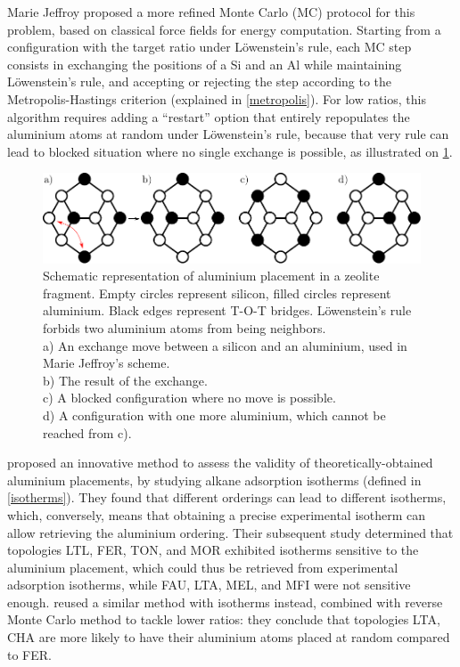 \documentclass[main.tex]{subfiles}
\begin{document}
Marie Jeffroy \cite{Jeffroy}\label{mariejeffroy_al} proposed a more refined Monte Carlo (MC) protocol for this problem, based on classical force fields for energy computation. Starting from a configuration with the target \SiAl ratio under L\"owenstein's rule, each MC step consists in exchanging the positions of a Si and an Al while maintaining L\"owenstein's rule, and accepting or rejecting the step according to the Metropolis-Hastings criterion (explained in \cref{metropolis}). For low \SiAl ratios, this algorithm requires adding a ``restart'' option that entirely repopulates the aluminium atoms at random under L\"owenstein's rule, because that very rule can lead to blocked situation where no single \SiAl exchange is possible, as illustrated on \cref{fig:blocked_situation}.

\begin{figure}
	\centering
	\includegraphics[width=\columnwidth]{figures/cations/blocked_situation.pdf}
	\caption{Schematic representation of aluminium placement in a zeolite fragment. Empty circles represent silicon, filled circles represent aluminium. Black edges represent T-O-T bridges. L\"owenstein's rule forbids two aluminium atoms from being neighbors.\\a) An exchange move between a silicon and an aluminium, used in Marie Jeffroy's scheme\autocite{Jeffroy}.\\b) The result of the exchange.\\c) A blocked configuration where no move is possible.\\d) A configuration with one more aluminium, which cannot be reached from c).}\label{fig:blocked_situation}
\end{figure}

\Textcite{AlDistributionAlcanes} proposed an innovative method to assess the validity of theoretically-obtained aluminium placements, by studying alkane adsorption isotherms (defined in \cref{isotherms}). They found that different \SiAl orderings can lead to different isotherms, which, conversely, means that obtaining a precise experimental isotherm can allow retrieving the aluminium ordering. Their subsequent study \cite{AlDistributionAlcanes2} determined that topologies LTL, FER, TON, and MOR exhibited isotherms sensitive to the aluminium placement, which could thus be retrieved from experimental adsorption isotherms, while FAU, LTA, MEL, and MFI were not sensitive enough. \Textcite{AlDistributionCO2Adsorption} reused a similar method with  isotherms instead, combined with reverse Monte Carlo method to tackle lower \SiAl ratios: they conclude that topologies LTA, CHA are more likely to have their aluminium atoms placed at random compared to FER.
\end{document}
